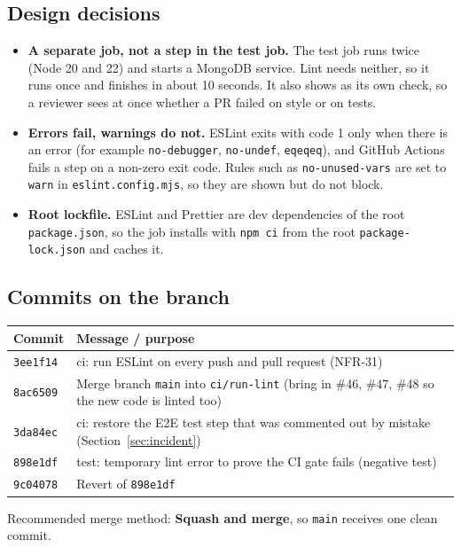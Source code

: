 \documentclass[11pt,a4paper]{article}
\begin{document}
\subsection{Design decisions}
\begin{itemize}
  \item \textbf{A separate job, not a step in the test job.} The test job runs twice (Node 20 and 22) and starts a MongoDB service.
        Lint needs neither, so it runs once and finishes in about 10 seconds. It also shows as its own check, so a reviewer sees at once
        whether a PR failed on style or on tests.
  \item \textbf{Errors fail, warnings do not.} ESLint exits with code 1 only when there is an error (for example \texttt{no-debugger},
        \texttt{no-undef}, \texttt{eqeqeq}), and GitHub Actions fails a step on a non-zero exit code. Rules such as
        \texttt{no-unused-vars} are set to \texttt{warn} in \texttt{eslint.config.mjs}, so they are shown but do not block.
  \item \textbf{Root lockfile.} ESLint and Prettier are dev dependencies of the root \texttt{package.json}, so the job installs with
        \texttt{npm ci} from the root \texttt{package-lock.json} and caches it.
\end{itemize}

\subsection{Commits on the branch}
\begin{center}\small\begin{tabularx}{\linewidth}{l X}\toprule
\textbf{Commit} & \textbf{Message / purpose}\\\midrule
\texttt{3ee1f14} & ci: run ESLint on every push and pull request (NFR-31)\\
\texttt{8ac6509} & Merge branch \texttt{main} into \texttt{ci/run-lint} (bring in \#46, \#47, \#48 so the new code is linted too)\\
\texttt{3da84ec} & ci: restore the E2E test step that was commented out by mistake (Section~\ref{sec:incident})\\
\texttt{898e1df} & test: temporary lint error to prove the CI gate fails (negative test)\\
\texttt{9c04078} & Revert of \texttt{898e1df}\\
\bottomrule\end{tabularx}\end{center}
Recommended merge method: \textbf{Squash and merge}, so \texttt{main} receives one clean commit.
\end{document}
